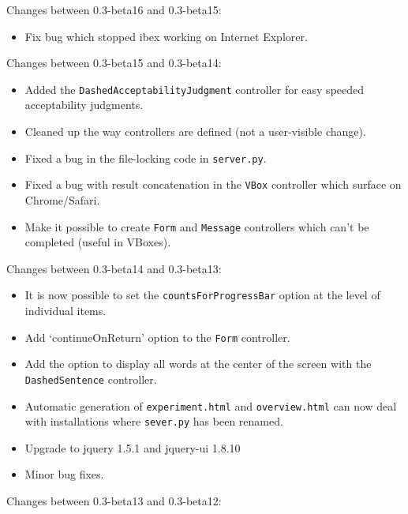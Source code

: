 \documentclass[]{article}
\begin{document}
Changes between 0.3-beta16 and 0.3-beta15:

\begin{itemize}
\itemsep1pt\parskip0pt
\item
  Fix bug which stopped ibex working on Internet Explorer.
\end{itemize}

Changes between 0.3-beta15 and 0.3-beta14:

\begin{itemize}
\itemsep1pt\parskip0pt
\item
  Added the \texttt{DashedAcceptabilityJudgment} controller for easy
  speeded acceptability judgments.
\item
  Cleaned up the way controllers are defined (not a user-visible
  change).
\item
  Fixed a bug in the file-locking code in \texttt{server.py}.
\item
  Fixed a bug with result concatenation in the \texttt{VBox} controller
  which surface on Chrome/Safari.
\item
  Make it possible to create \texttt{Form} and \texttt{Message}
  controllers which can't be completed (useful in VBoxes).
\end{itemize}

Changes between 0.3-beta14 and 0.3-beta13:

\begin{itemize}
\itemsep1pt\parskip0pt
\item
  It is now possible to set the \texttt{countsForProgressBar} option at
  the level of individual items.
\item
  Add `continueOnReturn' option to the \texttt{Form} controller.
\item
  Add the option to display all words at the center of the screen with
  the \texttt{DashedSentence} controller.
\item
  Automatic generation of \texttt{experiment.html} and
  \texttt{overview.html} can now deal with installations where
  \texttt{sever.py} has been renamed.
\item
  Upgrade to jquery 1.5.1 and jquery-ui 1.8.10
\item
  Minor bug fixes.
\end{itemize}

Changes between 0.3-beta13 and 0.3-beta12:
\end{document}
